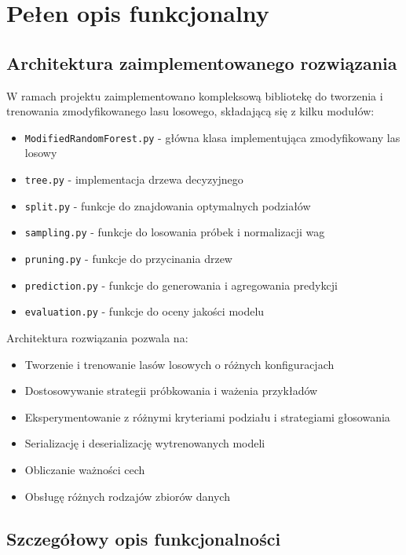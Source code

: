 \documentclass[11pt,a4paper]{article}
\begin{document}
\section{Pełen opis funkcjonalny}

\subsection{Architektura zaimplementowanego rozwiązania}

W ramach projektu zaimplementowano kompleksową bibliotekę do tworzenia i trenowania zmodyfikowanego lasu losowego, składającą się z kilku modułów:

\begin{itemize}
    \item \texttt{ModifiedRandomForest.py} - główna klasa implementująca zmodyfikowany las losowy
    \item \texttt{tree.py} - implementacja drzewa decyzyjnego
    \item \texttt{split.py} - funkcje do znajdowania optymalnych podziałów
    \item \texttt{sampling.py} - funkcje do losowania próbek i normalizacji wag
    \item \texttt{pruning.py} - funkcje do przycinania drzew
    \item \texttt{prediction.py} - funkcje do generowania i agregowania predykcji
    \item \texttt{evaluation.py} - funkcje do oceny jakości modelu
\end{itemize}

Architektura rozwiązania pozwala na:
\begin{itemize}
    \item Tworzenie i trenowanie lasów losowych o różnych konfiguracjach
    \item Dostosowywanie strategii próbkowania i ważenia przykładów
    \item Eksperymentowanie z różnymi kryteriami podziału i strategiami głosowania
    \item Serializację i deserializację wytrenowanych modeli
    \item Obliczanie ważności cech
    \item Obsługę różnych rodzajów zbiorów danych
\end{itemize}

\subsection{Szczegółowy opis funkcjonalności}
\end{document}
